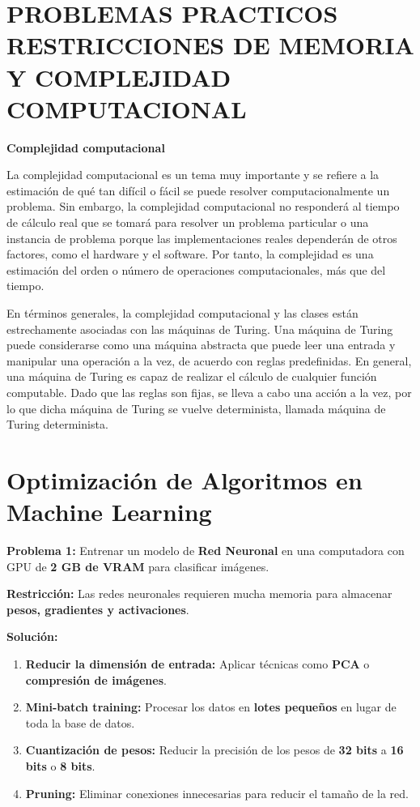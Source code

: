 \documentclass{article}
\begin{document}
	\section{PROBLEMAS PRACTICOS RESTRICCIONES DE MEMORIA Y COMPLEJIDAD COMPUTACIONAL}
	
	\textbf{Complejidad computacional}
	
	La complejidad computacional es un tema muy importante y se refiere a la estimación de qué tan difícil o fácil se puede resolver computacionalmente un problema. Sin embargo, la complejidad computacional no responderá al tiempo de cálculo real que se tomará para resolver un problema particular o una instancia de problema porque las implementaciones reales dependerán de otros factores, como el hardware y el software. Por tanto, la complejidad es una estimación del orden o número de operaciones computacionales, más que del tiempo.
	
	En términos generales, la complejidad computacional y las clases están estrechamente asociadas con las máquinas de Turing. Una máquina de Turing puede considerarse como una máquina abstracta que puede leer una entrada y manipular una operación a la vez, de acuerdo con reglas predefinidas. En general, una máquina de Turing es capaz de realizar el cálculo de cualquier función computable. Dado que las reglas son fijas, se lleva a cabo una acción a la vez, por lo que dicha máquina de Turing se vuelve determinista, llamada máquina de Turing determinista.
	
	\section{Optimización de Algoritmos en Machine Learning}
	
	\textbf{Problema 1:}  
	Entrenar un modelo de \textbf{Red Neuronal} en una computadora con GPU de \textbf{2 GB de VRAM} para clasificar imágenes.
	
	\textbf{Restricción:}  
	Las redes neuronales requieren mucha memoria para almacenar \textbf{pesos, gradientes y activaciones}.
	
	\textbf{Solución:}
	\begin{enumerate}
	\item \textbf{Reducir la dimensión de entrada:} Aplicar técnicas como \textbf{PCA} o \textbf{compresión de imágenes}.
	\item \textbf{Mini-batch training:} Procesar los datos en \textbf{lotes pequeños} en lugar de toda la base de datos.
	\item \textbf{Cuantización de pesos:} Reducir la precisión de los pesos de \textbf{32 bits} a \textbf{16 bits} o \textbf{8 bits}.
	\item \textbf{Pruning:} Eliminar conexiones innecesarias para reducir el tamaño de la red.
	\end{enumerate}
	
\end{document}
